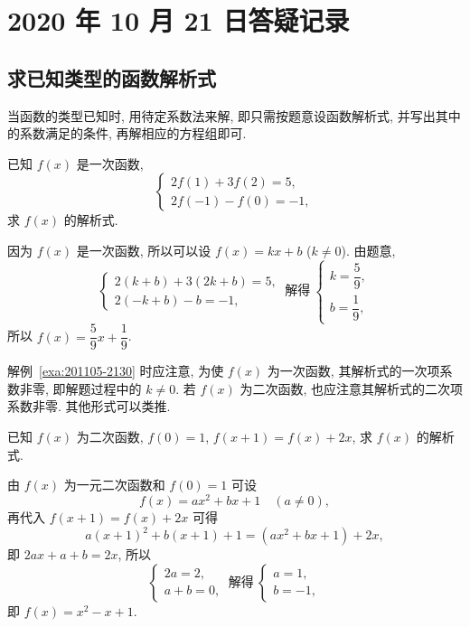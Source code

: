 \section{2020 年 10 月 21 日答疑记录}

\subsection{求已知类型的函数解析式}

当函数的类型已知时, 用待定系数法来解, 即只需按题意设函数解析式, 并写出其中的系数满足的条件, 再解相应的方程组即可.

\begin{example}\label{exa:201105-2130}
    已知 $f(x)$ 是一次函数, 
    \[\left\{\!\!\begin{array}{l}
        2f(1)+3f(2)=5,\\
        2f(-1)-f(0)=-1,
      \end{array}\right.\]
    求 $f(x)$ 的解析式.
\end{example}
\begin{solution}
    因为 $f(x)$ 是一次函数, 所以可以设 $f(x)=kx+b$ ($k\neq 0$). 由题意,
    \[\left\{\!\!\begin{array}{l}
        2(k+b)+3(2k+b)=5,\\
        2(-k+b)-b=-1,
      \end{array}\right.\ \text{解得}\ 
      \left\{\!\!\begin{array}{l}
        k=\dfrac59,\\[3pt]
        b=\dfrac19,
      \end{array}\right.\]
    所以 $f(x)=\dfrac59 x+ \dfrac19$.
\end{solution}

解例~\ref{exa:201105-2130} 时应注意, 为使 $f(x)$ 为一次函数, 其解析式的一次项系数非零, 即解题过程中的 $k\neq0$. 若 $f(x)$ 为二次函数, 也应注意其解析式的二次项系数非零. 其他形式可以类推.

\begin{example}\label{exa:201105-2140}
    已知 $f(x)$ 为二次函数, $f(0)=1$, $f(x+1)=f(x)+2x$, 求 $f(x)$ 的解析式.
\end{example}
\begin{solution}
    由 $f(x)$ 为一元二次函数和 $f(0)=1$ 可设 
    \[f(x)=ax^2+bx+1\quad (a\neq 0),\]
    再代入 $f(x+1)=f(x)+2x$ 可得
    \[a(x+1)^2+b(x+1)+1=(ax^2+bx+1)+2x,\]
    即 $2ax+a+b=2x$, 所以
    \[\left\{\!\!\begin{array}{l}
        2a=2,\\
        a+b=0,
      \end{array}\right.\ \text{解得}\ 
      \left\{\!\!\begin{array}{l}
        a=1,\\
        b=-1,
      \end{array}\right.\]
    即 $f(x)= x^2-x+1$.
\end{solution}

